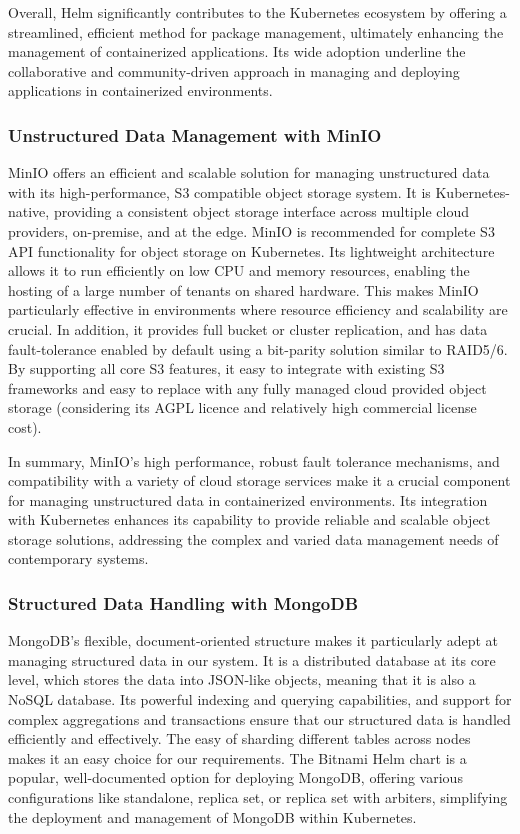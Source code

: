 \documentclass{report}
\begin{document}
    Overall, Helm significantly contributes to the Kubernetes ecosystem by offering a streamlined, efficient method for package management, ultimately enhancing the management of containerized applications. Its wide adoption underline the collaborative and community-driven approach in managing and deploying applications in containerized environments.

    \subsubsection{Unstructured Data Management with MinIO}
    MinIO offers an efficient and scalable solution for managing unstructured data with its high-performance, S3 compatible object storage system. It is Kubernetes-native, providing a consistent object storage interface across multiple cloud providers, on-premise, and at the edge. MinIO is recommended for complete S3 API functionality for object storage on Kubernetes. Its lightweight architecture allows it to run efficiently on low CPU and memory resources, enabling the hosting of a large number of tenants on shared hardware. This makes MinIO particularly effective in environments where resource efficiency and scalability are crucial. In addition, it provides full bucket or cluster replication, and has data fault-tolerance enabled by default using a bit-parity solution similar to RAID5/6. By supporting all core S3 features, it easy to integrate with existing S3 frameworks and easy to replace with any fully managed cloud provided object storage (considering its AGPL licence and relatively high commercial license cost).

    In summary, MinIO's high performance, robust fault tolerance mechanisms, and compatibility with a variety of cloud storage services make it a crucial component for managing unstructured data in containerized environments. Its integration with Kubernetes enhances its capability to provide reliable and scalable object storage solutions, addressing the complex and varied data management needs of contemporary systems.

    \subsubsection{Structured Data Handling with MongoDB}
    MongoDB's flexible, document-oriented structure makes it particularly adept at managing structured data in our system. It is a distributed database at its core level, which stores the data into JSON-like objects, meaning that it is also a NoSQL database. Its powerful indexing and querying capabilities, and support for complex aggregations and transactions ensure that our structured data is handled efficiently and effectively. The easy of sharding different tables across nodes makes it an easy choice for our requirements. The Bitnami Helm chart is a popular, well-documented option for deploying MongoDB, offering various configurations like standalone, replica set, or replica set with arbiters, simplifying the deployment and management of MongoDB within Kubernetes.
\end{document}
